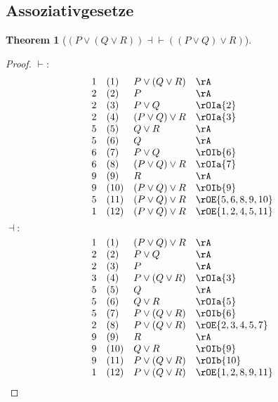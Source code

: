 \documentclass{book}
\theoremstyle{plain}
\newtheorem{theorem}{Theorem}
\theoremstyle{remark}
\theoremstyle{definition}
\begin{document}
\subsection{Assoziativgesetze}

\label{POrLpQOrRRpImpLpPOrQRpOrQ}
\begin{theorem}[\( (P \lor (Q \lor R)) \dashv\vdash ((P \lor Q) \lor R) \)]
\end{theorem}	
\begin{proof}
	\(\vdash:\)
	\[
	\begin{array}{llll}
		1 & (1) & P \lor (Q \lor R) & \rA \\
		2 & (2) & P & \rA \\
		2 & (3) & P \lor Q & \rOIa{2} \\
		2 & (4) & (P \lor Q) \lor R & \rOIa{3}  \\
		5 & (5) & Q \lor R & \rA \\
		5 & (6) & Q & \rA \\
		6 & (7) & P\lor Q & \rOIb{6}  \\
		6 & (8) & (P\lor Q)\lor R & \rOIa{7}  \\
		9 & (9) & R & \rA \\
		9 & (10) & (P\lor Q)\lor R & \rOIb{9} \\
		5 & (11) & (P\lor Q)\lor R & \rOE{5,6,8,9,10}\\	
		1 & (12) & (P\lor Q)\lor R & \rOE{1,2,4,5,11}\\	
	\end{array}
	\]
	\(\dashv:\)
	\[
	\begin{array}{llll}
		1 & (1) & (P \lor Q) \lor R & \rA \\
		2 & (2) & P \lor Q & \rA \\
		2 & (3) & P & \rA \\
		3 & (4) & P \lor (Q \lor R) & \rOIa{3} \\
		5 & (5) & Q & \rA \\
		5 & (6) & Q \lor R & \rOIa{5} \\
		5 & (7) & P \lor (Q \lor R) & \rOIb{6} \\
		2 & (8) & P \lor (Q \lor R) & \rOE{2,3,4,5,7} \\
		9 & (9) & R & \rA \\
		9 & (10) & Q \lor R & \rOIb{9} \\
		9 & (11) & P \lor (Q \lor R) & \rOIb{10} \\
		1 & (12) & P \lor (Q \lor R) & \rOE{1,2,8,9,11} \\
	\end{array}
	\]
\end{proof}
\end{document}
